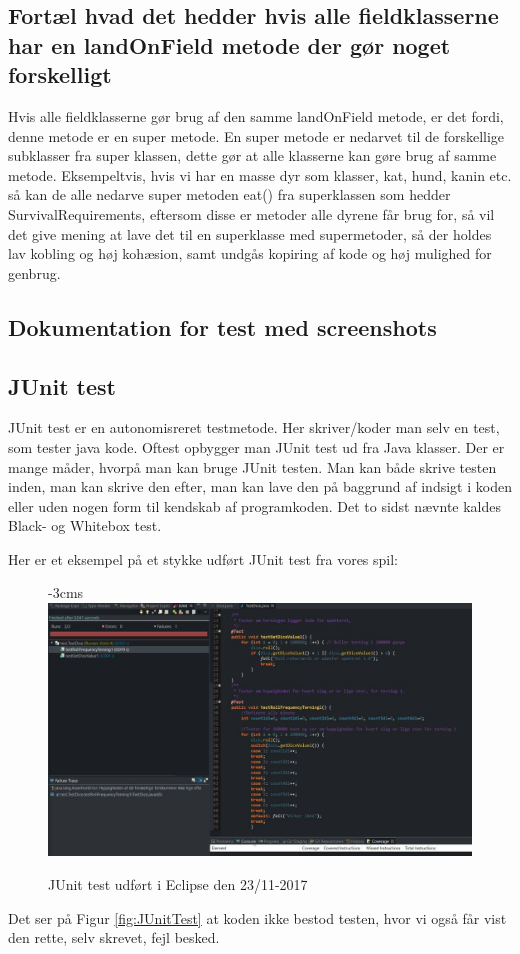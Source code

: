 \subsection{Fortæl hvad det hedder hvis alle fieldklasserne har en landOnField metode der gør noget forskelligt}


Hvis alle fieldklasserne gør brug af den samme landOnField metode, er det fordi, denne metode er en super metode. En super metode er nedarvet til de forskellige subklasser fra super klassen, dette gør at alle klasserne kan gøre brug af samme metode. Eksempeltvis, hvis vi har en masse dyr som klasser, kat, hund, kanin etc. så kan de alle nedarve super metoden eat() fra 
superklassen som hedder SurvivalRequirements, eftersom disse er metoder alle dyrene får brug for, så vil det give mening at lave det til en superklasse med supermetoder, så der holdes lav kobling og høj kohæsion, samt undgås kopiring af kode og høj mulighed for genbrug.

\subsection{Dokumentation for test med screenshots}
    \subsection{JUnit test}
        JUnit test er en autonomisreret testmetode. Her skriver/koder man selv en test, som tester java kode. Oftest opbygger man JUnit test ud fra Java klasser.
        Der er mange måder, hvorpå man kan bruge JUnit testen. Man kan både skrive testen inden, man kan skrive den efter, man kan lave den på baggrund af indsigt i koden eller uden nogen form til kendskab af programkoden. Det to sidst nævnte kaldes Black- og Whitebox test.

        Her er et eksempel på et stykke udført JUnit test fra vores spil:
            \begin{figure}[h]\label{fig:JunitTest.jpg}
                \advance\leftskip-3cms
                \includegraphics[width=20cm]{fig/JunitTest.jpg}
                \caption{JUnit test udført i Eclipse den 23/11-2017}
            \end{figure}
        Det ser på Figur \ref{fig:JUnitTest} at koden ikke bestod testen, hvor vi også får vist den rette, selv skrevet, fejl besked.

